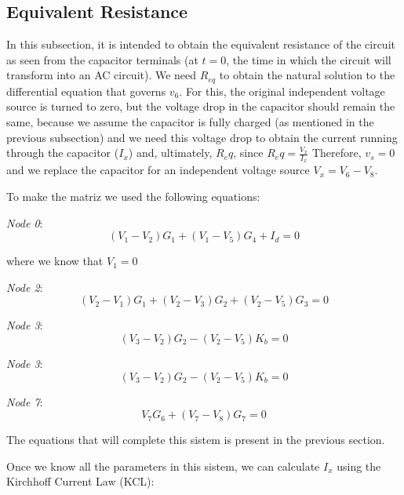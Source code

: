 \subsection{Equivalent Resistance}
\label{subsec:Nat_Sol_theory}

In this subsection, it is intended to obtain the equivalent resistance of the circuit as seen from the capacitor terminals (at $t=0$, the time in which the circuit will transform into an AC circuit). We need $R_{eq}$ to obtain the natural solution to the differential equation that governs $v_6$. For this, the original independent voltage source is turned to zero, but the voltage drop in the capacitor should remain the same, because we assume the capacitor is fully charged (as mentioned in the previous subsection) and we need this voltage drop to obtain the current running through the capacitor ($I_x$) and, ultimately, $R_eq$, since $R_eq = \frac{V_x}{I_x}$ Therefore, $v_s=0$ and we replace the capacitor for an independent voltage source $V_x = V_6 - V_8$.

To make the matriz we used the following equations:


\textit{Node 0}:
\begin{equation}
  (V_{1} - V_{2})G_{1} + (V_{1} - V_{5})G_{4} + I_d = 0
\end{equation}

where we know that $V_1=0$

\textit{Node 2}:
\begin{equation}
  (V_{2} - V_{1})G_{1} + (V_{2} - V_{3})G_{2} + (V_{2} - V_{5})G_{3}= 0
\end{equation}

\textit{Node 3}:
\begin{equation}
  (V_{3} - V_{2})G_{2} - (V_{2} - V_{5})K_{b} = 0
\end{equation}

\textit{Node 3}:
\begin{equation}
  (V_{3} - V_{2})G_{2} - (V_{2} - V_{5})K_{b} = 0
\end{equation}

\textit{Node 7}:
\begin{equation}
  V_{7}G_{6} + (V_{7} - V_{8})G_{7} = 0
\end{equation}


The equations that will complete this sistem is present in the previous section.

Once we know all the parameters in this sistem, we can calculate $I_x$ using the Kirchhoff Current Law (KCL):

